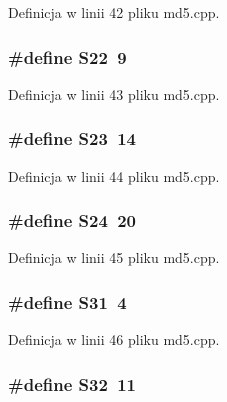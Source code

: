 Definicja w linii 42 pliku md5.cpp.\hypertarget{a00010_ddad30455da936bc1879ee9c72b46d59}{
\subsubsection[{S22}]{\setlength{\rightskip}{0pt plus 5cm}\#define S22~9}}
\label{d7/dec/a00010_ddad30455da936bc1879ee9c72b46d59}




Definicja w linii 43 pliku md5.cpp.\hypertarget{a00010_6321a8b29628936f76e9e78cf5bda95f}{
\subsubsection[{S23}]{\setlength{\rightskip}{0pt plus 5cm}\#define S23~14}}
\label{d7/dec/a00010_6321a8b29628936f76e9e78cf5bda95f}




Definicja w linii 44 pliku md5.cpp.\hypertarget{a00010_0c09eb77d30a0d5f9154914147b86c20}{
\subsubsection[{S24}]{\setlength{\rightskip}{0pt plus 5cm}\#define S24~20}}
\label{d7/dec/a00010_0c09eb77d30a0d5f9154914147b86c20}




Definicja w linii 45 pliku md5.cpp.\hypertarget{a00010_ef26590f8a880ee6f4a158168defcd89}{
\subsubsection[{S31}]{\setlength{\rightskip}{0pt plus 5cm}\#define S31~4}}
\label{d7/dec/a00010_ef26590f8a880ee6f4a158168defcd89}




Definicja w linii 46 pliku md5.cpp.\hypertarget{a00010_1d512424dd8a91e0a5bcc98563f33914}{
\subsubsection[{S32}]{\setlength{\rightskip}{0pt plus 5cm}\#define S32~11}}
\label{d7/dec/a00010_1d512424dd8a91e0a5bcc98563f33914}




